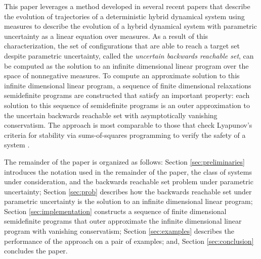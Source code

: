 This paper leverages a method developed in several recent papers \cite{henrion2014convex,majumdar2014convex,shia2014convex} that describe the evolution of trajectories of a deterministic hybrid dynamical system using measures to describe the evolution of a hybrid dynamical system with parametric uncertainty as a linear equation over measures. 
As a result of this characterization, the set of configurations that are able to reach a target set despite parametric uncertainty, called the \emph{uncertain backwards reachable set}, can be computed as the solution to an infinite dimensional linear program over the space of nonnegative measures. 
To compute an approximate solution to this infinite dimensional linear program, a sequence of finite dimensional relaxations semidefinite programs are constructed that satisfy an important property:
each solution to this sequence of semidefinite programs is an outer approximation to the uncertain backwards reachable set with asymptotically vanishing conservatism.
The approach is most comparable to those that check Lyapunov's criteria for stability via sums-of-squares programming to verify the safety of a system \cite{}.


The remainder of the paper is organized as follows: 
Section \ref{sec:preliminaries} introduces the notation used in the remainder of the paper, the class of systems under consideration, and the backwards reachable set problem under parametric uncertainty; 
Section \ref{sec:prob} describes how the backwards reachable set under parametric uncertainty is the solution to an infinite dimensional linear program; 
Section \ref{sec:implementation} constructs a sequence of finite dimensional semidefinite programs that outer approximate the infinite dimensional linear program with vanishing conservatism; 
Section \ref{sec:examples} describes the performance of the approach on a pair of examples; 
and, Section \ref{sec:conclusion} concludes the paper. 